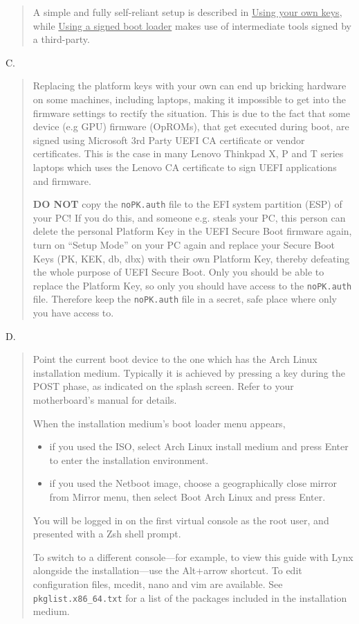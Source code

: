 \documentclass{exam-zh}
\begin{document}
\begin{question}
\begin{quote}
  A simple and fully self-reliant setup is described in \underline{Using your own keys}, while \allowbreak \underline{Using a signed boot loader} makes use of intermediate tools signed by a third-party.
\end{quote}

C.
\begin{quote}
  Replacing the platform keys with your own can end up bricking hardware on some machines, including laptops, making it impossible to get into the firmware settings to rectify the situation. This is due to the fact that some device (e.g GPU) firmware (OpROMs), that get executed during boot, are signed using Microsoft 3rd Party UEFI CA certificate or vendor certificates. This is the case in many Lenovo Thinkpad X, P and T series laptops which uses the Lenovo CA certificate to sign UEFI applications and firmware.

  \textbf{DO NOT} copy the \texttt{noPK.auth} file to the EFI system partition (ESP) of your PC! If you do this, and someone e.g. steals your PC, this person can delete the personal Platform Key in the UEFI Secure Boot firmware again, turn on ``Setup Mode'' on your PC again and replace your Secure Boot Keys (PK, KEK, db, dbx) with their own Platform Key, thereby defeating the whole purpose of UEFI Secure Boot. Only you should be able to replace the Platform Key, so only you should have access to the \texttt{noPK.auth} file. Therefore keep the \texttt{noPK.auth} file in a secret, safe place where only you have access to.
\end{quote}

D.
\begin{quote}
  Point the current boot device to the one which has the Arch Linux installation medium. Typically it is achieved by pressing a key during the POST phase, as indicated on the splash screen. Refer to your motherboard's manual for details.

  When the installation medium's boot loader menu appears,

  \begin{itemize}
    \item if you used the ISO, select Arch Linux install medium and press Enter to enter the installation environment.

    \item if you used the Netboot image, choose a geographically close mirror from Mirror menu, then select Boot Arch Linux and press Enter.
  \end{itemize}

  You will be logged in on the first virtual console as the root user, and presented with a Zsh shell prompt.

  To switch to a different console—for example, to view this guide with Lynx alongside the installation—use the Alt+arrow shortcut. To edit configuration files, mcedit, nano and vim are available. See \texttt{pkglist.x86\_64.txt} for a list of the packages included in the installation medium.
\end{quote}
\end{question}
\end{document}
